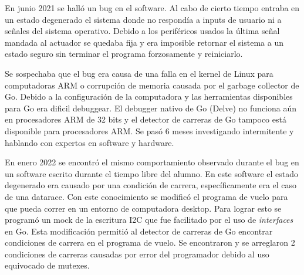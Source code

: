 En junio 2021 se halló un bug en el software. Al cabo de cierto tiempo entraba en un estado degenerado el sistema donde no respondía a inputs de usuario ni a señales del sistema operativo. Debido a los periféricos usados la última señal mandada al actuador se quedaba fija y era imposible retornar el sistema a un estado seguro sin terminar el programa forzosamente y reiniciarlo. 

Se sospechaba que el bug era causa de una falla en el kernel de Linux para computadoras ARM o corrupción de memoria causada por el garbage collector de Go. Debido a la configuración de la computadora y las herramientas disponibles para Go era dificil debuggear. El debugger nativo de Go (Delve) no funciona aún en procesadores ARM de 32 bits y el detector de carreras de Go tampoco está disponible para procesadores ARM. Se pasó 6 meses investigando intermitente y hablando con expertos en software y hardware.

En enero 2022 se encontró el mismo comportamiento observado durante el bug en un software escrito durante el tiempo libre del alumno. En este software el estado degenerado era causado por una condición de carrera, específicamente era el caso de una \gls{datarace}. Con este conocimiento se modificó el programa de vuelo para que pueda correr en un entorno de computadora desktop. Para lograr esto se programó un mock de la escritura I2C que fue facilitado por el uso de \textit{interfaces} en Go. Esta modificación permitió al detector de carreras de Go encontrar condiciones de carrera en el programa de vuelo. Se encontraron y se arreglaron 2 condiciones de carreras causadas por error del programador debido al uso equivocado de mutexes.
